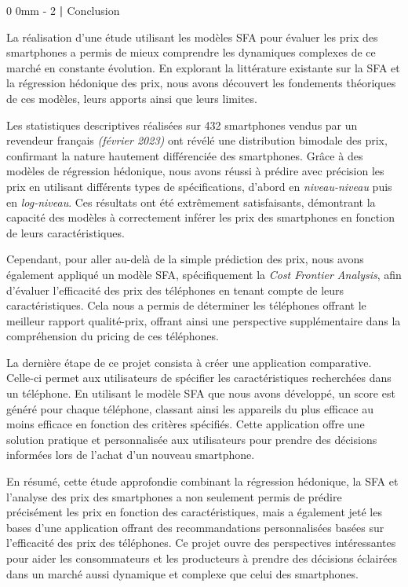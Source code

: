 \documentclass[
  12pt,
]{report}
\makeatletter
\renewcommand{\chapter}{%
    \clearpage %
    \@startsection{chapter}%
    {0} %
    {0mm} %
    {-\baselineskip} %
    {2\baselineskip} %
    {\normalfont\Huge\bfseries | \Huge\bfseries}%
}
\makeatother
\begin{document}
\chapter{Conclusion}\label{conclusion-2}

La réalisation d'une étude utilisant les modèles SFA pour évaluer les
prix des smartphones a permis de mieux comprendre les dynamiques
complexes de ce marché en constante évolution. En explorant la
littérature existante sur la SFA et la régression hédonique des prix,
nous avons découvert les fondements théoriques de ces modèles, leurs
apports ainsi que leurs limites.

Les statistiques descriptives réalisées sur 432 smartphones vendus par
un revendeur français \emph{(février 2023)} ont révélé une distribution
bimodale des prix, confirmant la nature hautement différenciée des
smartphones. Grâce à des modèles de régression hédonique, nous avons
réussi à prédire avec précision les prix en utilisant différents types
de spécifications, d'abord en \emph{niveau-niveau} puis en
\emph{log-niveau}. Ces résultats ont été extrêmement satisfaisants,
démontrant la capacité des modèles à correctement inférer les prix des
smartphones en fonction de leurs caractéristiques.

Cependant, pour aller au-delà de la simple prédiction des prix, nous
avons également appliqué un modèle SFA, spécifiquement la \emph{Cost
Frontier Analysis}, afin d'évaluer l'efficacité des prix des téléphones
en tenant compte de leurs caractéristiques. Cela nous a permis de
déterminer les téléphones offrant le meilleur rapport qualité-prix,
offrant ainsi une perspective supplémentaire dans la compréhension du
pricing de ces téléphones.

La dernière étape de ce projet consista à créer une application
comparative. Celle-ci permet aux utilisateurs de spécifier les
caractéristiques recherchées dans un téléphone. En utilisant le modèle
SFA que nous avons développé, un score est généré pour chaque téléphone,
classant ainsi les appareils du plus efficace au moins efficace en
fonction des critères spécifiés. Cette application offre une solution
pratique et personnalisée aux utilisateurs pour prendre des décisions
informées lors de l'achat d'un nouveau smartphone.

En résumé, cette étude approfondie combinant la régression hédonique, la
SFA et l'analyse des prix des smartphones a non seulement permis de
prédire précisément les prix en fonction des caractéristiques, mais a
également jeté les bases d'une application offrant des recommandations
personnalisées basées sur l'efficacité des prix des téléphones. Ce
projet ouvre des perspectives intéressantes pour aider les consommateurs
et les producteurs à prendre des décisions éclairées dans un marché
aussi dynamique et complexe que celui des smartphones.
\end{document}
